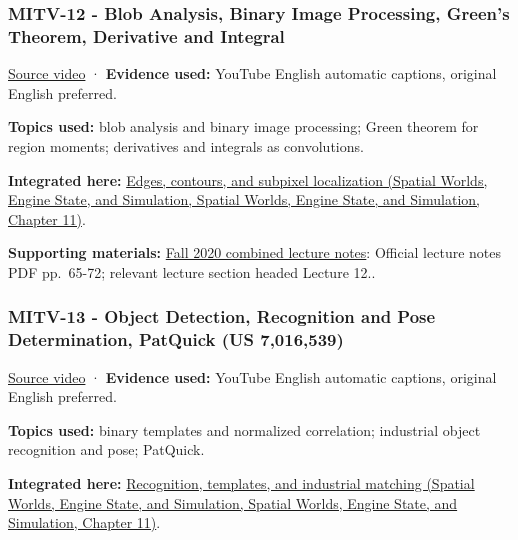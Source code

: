 \subsubsection{MITV-12 - Blob Analysis, Binary Image Processing, Green's Theorem, Derivative and Integral}\label{04-visual-computing-ii-ch036-mitv-12---blob-analysis-binary-image-processing-greens-theorem-derivative-and-integral}

\href{https://www.youtube.com/watch?v=jLvgNmGuxGk}{Source video} · \textbf{Evidence used:} YouTube English automatic captions, original English preferred.

\textbf{Topics used:} blob analysis and binary image processing; Green theorem for region moments; derivatives and integrals as convolutions.

\textbf{Integrated here:} \href{../05-Spatial-Worlds-Engine-State-and-Simulation/main.pdf\#nameddest=04-visual-computing-ii-ch030-edges-contours-and-subpixel-localization}{Edges, contours, and subpixel localization (Spatial Worlds, Engine State, and Simulation, Spatial Worlds, Engine State, and Simulation, Chapter 11)}.

\textbf{Supporting materials:} \href{https://ocw.mit.edu/courses/6-801-machine-vision-fall-2020/9ec44f69e72995c370b3797818ba01e6_MIT6_801F20_lectureNotes.pdf}{Fall 2020 combined lecture notes}: Official lecture notes PDF pp.~65-72; relevant lecture section headed Lecture 12..

\subsubsection{MITV-13 - Object Detection, Recognition and Pose Determination, PatQuick (US 7,016,539)}\label{04-visual-computing-ii-ch036-mitv-13---object-detection-recognition-and-pose-determination-patquick-us-7016539}

\href{https://www.youtube.com/watch?v=lVfm6C51t_Y}{Source video} · \textbf{Evidence used:} YouTube English automatic captions, original English preferred.

\textbf{Topics used:} binary templates and normalized correlation; industrial object recognition and pose; PatQuick.

\textbf{Integrated here:} \href{../05-Spatial-Worlds-Engine-State-and-Simulation/main.pdf\#nameddest=04-visual-computing-ii-ch030-recognition-templates-and-industrial-matching}{Recognition, templates, and industrial matching (Spatial Worlds, Engine State, and Simulation, Spatial Worlds, Engine State, and Simulation, Chapter 11)}.

